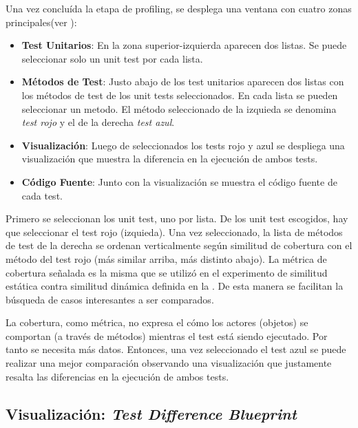 \par Una vez concluída la etapa de profiling, se desplega una ventana con cuatro zonas principales(ver ): 
\begin{itemize}
\item {\bf Test Unitarios}: En la zona superior-izquierda aparecen dos listas. Se puede seleccionar solo un unit test por cada lista.
\item {\bf Métodos de Test}: Justo abajo de los test unitarios aparecen dos listas con los métodos de test de los unit tests seleccionados. En cada lista se pueden seleccionar un metodo. El método seleccionado de la izquieda se denomina \emph{test rojo} y el de la derecha \emph{test azul}.
\item {\bf Visualización}: Luego de seleccionados los tests rojo y azul se despliega una visualización que muestra la diferencia en la ejecución de ambos tests.
\item {\bf Código Fuente}: Junto con la visualización se muestra el código fuente de cada test.
\end{itemize}


\par Primero se seleccionan los unit test, uno por lista. De los unit test escogidos, hay que seleccionar el test rojo (izquieda). Una vez seleccionado, la lista de métodos de test de la derecha se ordenan verticalmente según similitud de cobertura con el método del test rojo (más similar arriba, más distinto abajo). La métrica de cobertura señalada es la misma que se utilizó en el experimento de similitud estática contra similitud dinámica definida en la . De esta manera se facilitan la búsqueda de casos interesantes a ser comparados. 

\par La cobertura, como métrica, no expresa el cómo los actores (objetos) se comportan (a través de métodos) mientras el test está siendo ejecutado. Por tanto se necesita más datos. Entonces, una vez seleccionado el test azul se puede realizar una mejor comparación observando una visualización que justamente resalta las diferencias en la ejecución de ambos tests.

\subsection{Visualización: \emph{Test Difference Blueprint}}

